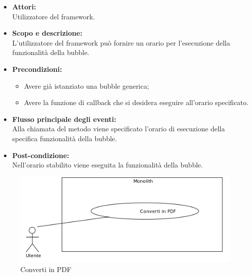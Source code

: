 \begin{itemize}
	\item \textbf{Attori:}
	\\Utilizzatore del framework.
	\item \textbf{Scopo e descrizione:} 
	\\L'utilizzatore del framework può fornire un orario per l'esecuzione della funzionalità della bubble.
	\item \textbf{Precondizioni:}
	\begin{itemize}
		\item Avere già istanziato una bubble generica;
		\item Avere la funzione di callback che si desidera eseguire all'orario specificato.
	\end{itemize}
	\item \textbf{Flusso principale degli eventi:}
	\\Alla chiamata del metodo viene specificato l'orario di esecuzione della specifica funzionalità della bubble.
	\item \textbf{Post-condizione:}
	\\Nell'orario stabilito viene eseguita la funzionalità della bubble.
\end{itemize}


\begin{figure}[H]
	\centering
	\includegraphics[width=15cm]{../../documenti/AnalisiDeiRequisiti/Diagrammi_img/uc1_20.png}
	\caption{\UCCCaption{} Converti in PDF}
\end{figure}

